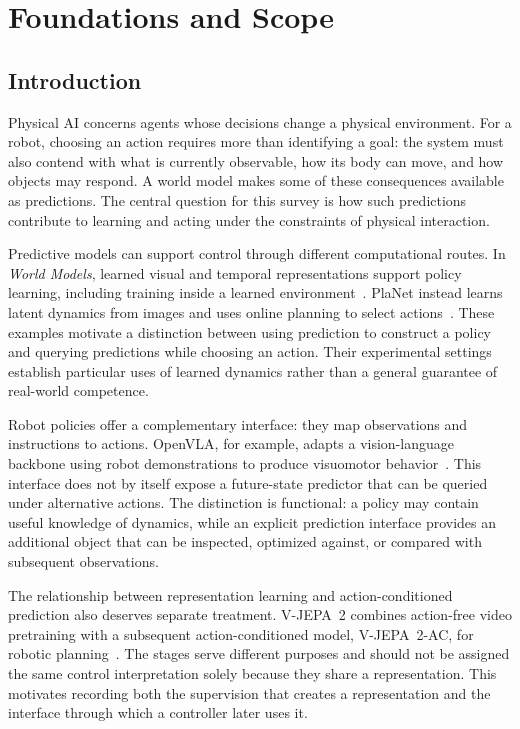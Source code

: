 \section{Foundations and Scope}
\label{sec:foundations}

\subsection{Introduction}
Physical AI concerns agents whose decisions change a physical environment. For a robot, choosing an action requires more than identifying a goal: the system must also contend with what is currently observable, how its body can move, and how objects may respond. A world model makes some of these consequences available as predictions. The central question for this survey is how such predictions contribute to learning and acting under the constraints of physical interaction.

Predictive models can support control through different computational routes. In \emph{World Models}, learned visual and temporal representations support policy learning, including training inside a learned environment~\cite{ha2018worldmodels}. PlaNet instead learns latent dynamics from images and uses online planning to select actions~\cite{hafner2019planet}. These examples motivate a distinction between using prediction to construct a policy and querying predictions while choosing an action. Their experimental settings establish particular uses of learned dynamics rather than a general guarantee of real-world competence.

Robot policies offer a complementary interface: they map observations and instructions to actions. OpenVLA, for example, adapts a vision-language backbone using robot demonstrations to produce visuomotor behavior~\cite{kim2024openvla}. This interface does not by itself expose a future-state predictor that can be queried under alternative actions. The distinction is functional: a policy may contain useful knowledge of dynamics, while an explicit prediction interface provides an additional object that can be inspected, optimized against, or compared with subsequent observations.

The relationship between representation learning and action-conditioned prediction also deserves separate treatment. V-JEPA~2 combines action-free video pretraining with a subsequent action-conditioned model, V-JEPA~2-AC, for robotic planning~\cite{assran2025vjepa2}. The stages serve different purposes and should not be assigned the same control interpretation solely because they share a representation. This motivates recording both the supervision that creates a representation and the interface through which a controller later uses it.

